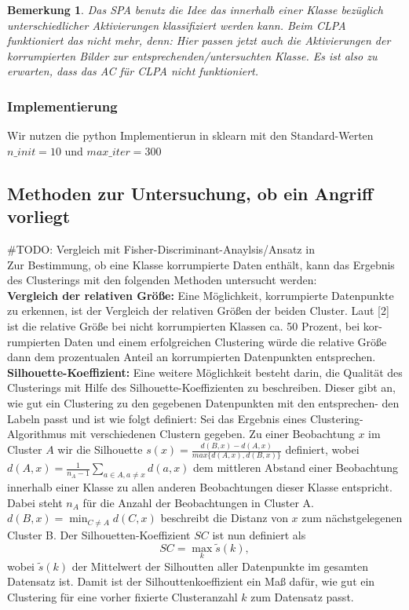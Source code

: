 \documentclass[11pt,a4paper]{article}
\newtheorem{remark}[theorem]{Bemerkung}
\numberwithin{equation}{section}
\begin{document}
		\begin{remark}
			Das SPA benutz die Idee das innerhalb einer Klasse bezüglich unterschiedlicher Aktivierungen klassifiziert werden kann. Beim CLPA funktioniert das nicht mehr, denn: Hier passen jetzt auch die Aktivierungen der korrumpierten Bilder zur entsprechenden/untersuchten Klasse. Es ist also zu erwarten, dass das AC für CLPA nicht funktioniert.
		\end{remark}
	
		\subsubsection{Implementierung}
		Wir nutzen die python Implementierun in sklearn mit den Standard-Werten $n\_init=10$ und $max\_iter=300$
		
		
		\subsection{Methoden zur Untersuchung, ob ein Angriff vorliegt}
		\#TODO: Vergleich mit Fisher-Discriminant-Anaylsis/Ansatz in \cite{imagenet_unhansed_v1}\\
		Zur
		Bestimmung, ob eine Klasse korrumpierte Daten enthält, kann das Ergebnis
		des Clusterings mit den folgenden Methoden untersucht werden:\\
		
		\noindent \textbf{Vergleich der relativen Größe:} Eine Möglichkeit, korrumpierte Datenpunkte
		zu erkennen, ist der Vergleich der relativen Größen der beiden Cluster. Laut [2]
		ist die relative Größe bei nicht korrumpierten Klassen ca. 50 Prozent, bei kor-
		rumpierten Daten und einem erfolgreichen Clustering würde die relative Größe
		dann dem prozentualen Anteil an korrumpierten Datenpunkten entsprechen.\\
		
		\noindent \textbf{Silhouette-Koeffizient:} Eine weitere Möglichkeit besteht darin, die Qualität
		des Clusterings mit Hilfe des Silhouette-Koeffizienten zu beschreiben. Dieser gibt
		an, wie gut ein Clustering zu den gegebenen Datenpunkten mit den entsprechen-
		den Labeln passt und ist wie folgt definiert: Sei das Ergebnis eines Clustering-
		Algorithmus mit verschiedenen Clustern gegeben. Zu einer Beobachtung $x$ im Cluster $A$ wir die Silhouette $s(x) = \frac{d(B,x)-d(A,x)}{max\lbrace d(A,x), d(B,x) \rbrace}$ definiert, wobei $d(A,x)  = \frac{1}{n_A -1}\sum_{a \in A, a \neq x}{d(a,x)}$ dem mittleren Abstand einer Beobachtung innerhalb einer Klasse zu allen anderen Beobachtungen dieser Klasse entspricht.
		Dabei steht $n_A$ für die Anzahl der Beobachtungen in Cluster A. $d(B,x) = \min_{C \neq A}d(C,x)$ beschreibt die Distanz von $x$ zum nächstgelegenen Cluster B. Der Silhouetten-Koeffizient $SC$ ist nun definiert als
		\begin{equation}
			SC = \max_k \tilde{s}(k),
		\end{equation}
		wobei $\tilde{s}(k)$ der Mittelwert der Silhoutten aller Datenpunkte im gesamten Datensatz ist. Damit ist der Silhouttenkoeffizient ein Maß dafür, wie gut ein Clustering für eine vorher fixierte Clusteranzahl $k$ zum Datensatz passt.\\
		
\end{document}
